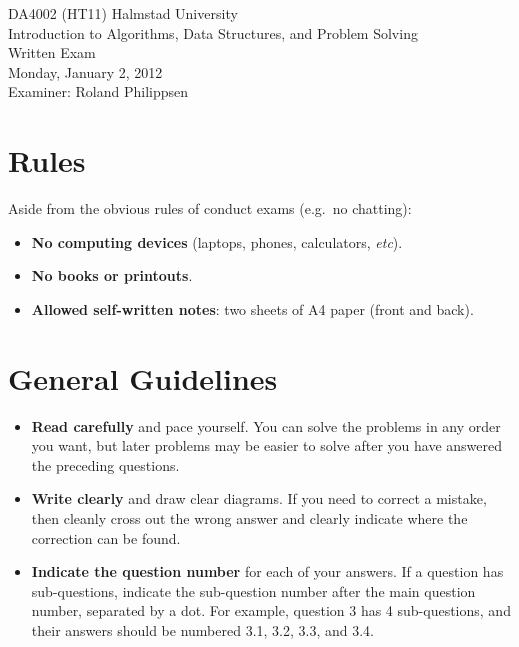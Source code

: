 \documentclass[a4paper]{article}
\newcounter{question}
\begin{document}
\pagestyle{empty}
\thispagestyle{empty}



\noindent
\begin{minipage}{\columnwidth}
  \centering
  \Large
  DA4002 (HT11) Halmstad University\\
  Introduction to Algorithms, Data Structures, and Problem Solving\\[3\baselineskip]
  \Huge
  Written Exam\\
  \Large
  Monday, January 2, 2012\\[2\baselineskip]
  Examiner: Roland Philippsen
\end{minipage}

\vfill

\noindent
\begin{center}
\end{center}

\vfill



\section*{Rules}

Aside from the obvious rules of conduct exams (e.g.\ no chatting):

\begin{itemize}
\item
  \textbf{No computing devices} (laptops, phones, calculators, \emph{etc}).
\item
  \textbf{No books or printouts}.
\item
  \textbf{Allowed self-written notes}: two sheets of A4 paper (front and back).
\end{itemize}



\section*{General Guidelines}

\begin{itemize}
\item
  \textbf{Read carefully} and pace yourself.
  You can solve the problems in any order you want, but later problems may be easier to solve after you have answered the preceding questions.
\item
  \textbf{Write clearly} and draw clear diagrams.
  If you need to correct a mistake, then cleanly cross out the wrong answer and clearly indicate where the correction can be found.
\item
  \textbf{Indicate the question number} for each of your answers.
  If a question has sub-questions, indicate the sub-question number after the main question number, separated by a dot.
  For example, question 3 has 4 sub-questions, and their answers should be numbered 3.1, 3.2, 3.3, and 3.4.
\end{itemize}
\end{document}
